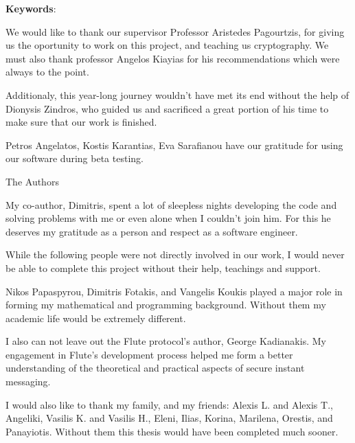 \documentclass[
11pt, %
english, %
singlespacing, %
parskip, %
headsepline, %
]{MastersDoctoralThesis} %
\begin{document}
  \vspace*{\fill}

{\bf Keywords}: \keywordnames



\begin{acknowledgements}
\addchaptertocentry{\acknowledgementname} %

We would like to thank our supervisor Professor Aristedes Pagourtzis, for giving us the oportunity to work on this project, and teaching us cryptography.
We must also thank professor Angelos Kiayias for his recommendations which were always to the point.

Additionaly, this year-long journey wouldn't have met its end without the help of Dionysis Zindros, who guided us and sacrificed a great portion of his time to make sure that our work is finished.

Petros Angelatos, Kostis Karantias, Eva Sarafianou have our gratitude for using our software during beta testing.

\bigbreak
\hfill The Authors

My co-author, Dimitris, spent a lot of sleepless nights developing the code and solving problems with me or even alone when I couldn't join him.
For this he deserves my gratitude as a person and respect as a software engineer.

While the following people were not directly involved in our work, I would never be able to complete this project without their help, teachings and support.

Nikos Papaspyrou, Dimitris Fotakis, and Vangelis Koukis played a major role in forming my mathematical and programming background.
Without them my academic life would be extremely different.

I also can not leave out the Flute protocol's author, George Kadianakis.
My engagement in Flute's development process helped me form a better understanding of the theoretical and practical aspects of secure instant messaging.

I would also like to thank my family, and my friends: Alexis L. and Alexis T., Angeliki, Vasilis K. and Vasilis H., Eleni, Ilias, Korina, Marilena, Orestis, and Panayiotis.
Without them this thesis would have been completed much sooner.


\end{acknowledgements}
\end{document}
